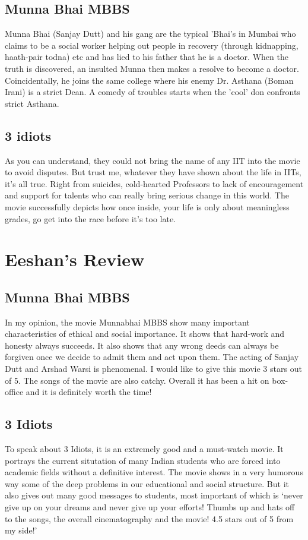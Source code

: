 \documentclass{article}
\begin{document}
\subsection{Munna Bhai MBBS}

 Munna Bhai (Sanjay Dutt) and his gang are the typical 'Bhai's in Mumbai who claims to be a social worker helping out people in recovery (through kidnapping, haath-pair todna) etc and has lied to his father that he is a doctor. When the truth is discovered, an insulted Munna then makes a resolve to become a doctor. Coincidentally, he joins the same college where his enemy Dr. Asthana (Boman Irani) is a strict Dean. A comedy of troubles starts when the 'cool' don confronts strict Asthana.

\subsection{3 idiots}

As you can understand, they could not bring the name of any IIT into the movie to avoid disputes. But trust me, whatever they have shown about the life in IITs, it's all true. Right from suicides, cold-hearted Professors to lack of encouragement and support for talents who can really bring serious change in this world. The movie successfully depicts how once inside, your life is only about meaningless grades, go get into the race before it's too late.

\section{Eeshan's Review}
\subsection{Munna Bhai MBBS}
In my opinion, the movie Munnabhai MBBS show many important characteristics of ethical and social importance. It shows that hard-work and honesty always succeeds. It also shows that any wrong deeds can always be forgiven once we decide to admit them and act upon them. The acting of Sanjay Dutt and Arshad Warsi is phenomenal. I would like to give this movie 3 stars out of 5. The songs of the movie are also catchy. Overall it has been a hit on box-office and it is definitely worth the time! 
\subsection{3 Idiots}
To speak about 3 Idiots, it is an extremely good and a must-watch movie. It portrays the current situtation of many Indian students who are forced into academic fields without a definitive interest. The movie shows in a very humorous way some of the deep problems in our educational and social structure. But it also gives out many good messages to students, most important of which is `never give up on your dreams and never give up your efforts! Thumbs up and hats off to the songs, the overall cinematography and the movie! 4.5 stars out of 5 from my side!'
\end{document}
